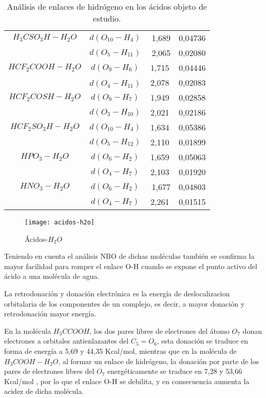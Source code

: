 \begin{table}[H]
\begin{tabular}{|c|c|c|c|}
 $H_3CSO_3H-H_2O$	& $d(O_{10}-H_4)$	&﻿ 1,689	& 0,04736 \\ \cline{2-4}
	& $d(O_5-H_{11})$	&﻿ 2,065 &	0,02080 \\ \hline
 $HCF_2COOH-H_2O$	& $d(O_9-H_6)$	&﻿1,715	& 0,04446 \\ \cline{2-4}
	& $d(O_4-H_{11})$﻿ & 2,078	& 0,02083 \\ \hline
 $HCF_2COSH-H_2O$	& $d(O_9-H_7)$ &1,949 & 0,02858 \\ \cline{2-4}
	& $d(O_3-H_{10})$ & 2,021 &	0,02186 \\ \hline
 $HCF_2SO_3H-H_2O$	& $d(O_{10}-H_4)$ & 1,634	& 0,05386 \\ \cline{2-4}
&	$d(O_5-H_{12})$ & 2,110	& 0,01899 \\ \hline
 $HPO_3-H_2O$	& $d(O_6-H_2)$ & 1,659	& 0,05063 \\ \cline{2-4}
	& $d(O_4-H_7)$ & 2,103	& 0,01920 \\ \hline
 $HNO_3-H_2O$	& $d(O_6-H_2)$	&﻿ 1,677	& 0,04803 \\ \cline{2-4}
	& $d(O_4-H_7)$ & 2,261	& 0,01515 \\ \hline
	\end{tabular}
\caption{Análisis de enlaces de hidrógeno en los ácidos objeto de estudio.}
\end{table}
\begin{figure}[H]
	\centering
	\texttt{[image: acidos-h2o]}
	\caption{Ácidos-$H_2O$}
\end{figure}
 Teniendo en cuenta el análisis NBO de dichas moléculas también se confirma la mayor facilidad para romper el enlace O-H cuando se expone el punto activo del ácido a una molécula de agua.
 
 La retrodonación y donación electrónica es la energía de deslocalizacion orbitalaria de los componentes de un complejo, es decir, a mayor donación y retrodonación mayor energía.
 
 En la molécula $H_3CCOOH$, los dos pares libres de electrones del átomo $O_7$ donan electrones a orbitales antienlazantes del $C_5=O_6$, esta donación se traduce en forma de energía a 5,69 y 44,35 Kcal/mol,  mientras que en la molécula de $H_3COOH-H_2O$, al formar un enlace de hidrógeno, la donación por parte de los pares de electrones libres del $O_7$ energéticamente se traduce en 7,28 y 53,66 Kcal/mol , por lo que el enlace O-H se debilita, y en consecuencia aumenta la acidez de dicha molécula.
 
